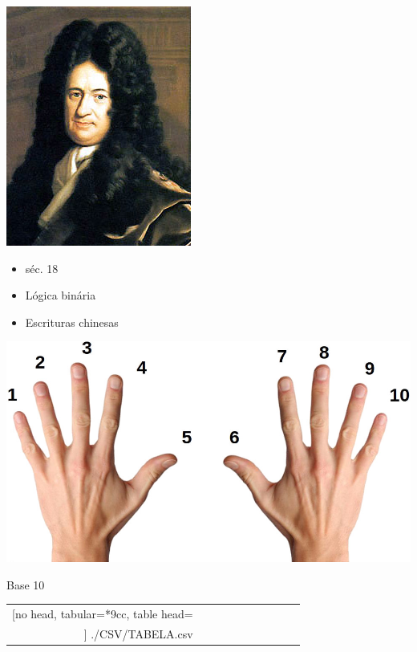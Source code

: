 \begin{multicols}{2}
	\begin{center}
	\includegraphics[height=.9\textheight]{./IMG/Gottfried+Wilhelm+Leibniz.jpg}
	\end{center}
	
	\vfill
	\columnbreak

\begin{itemize}
	\item séc. 18
	\item Lógica binária
	\item Escrituras chinesas
\end{itemize}	
\end{multicols}

\vfill
\pagebreak

\begin{center}
	\includegraphics[height=\textheight]{./IMG/MAO-10.jpg}
\end{center}

\vfill
\pagebreak

{\Huge
Base 10
}
\vspace*{-10mm}
{
	\Large
\begin{center}
		\begin{tabular}{*{10}{r}}
	\csvreader[no head, tabular=*{9}{c}c, table head=\\]%
	{./CSV/TABELA.csv}{}%
	{\csvcoli &}%
\end{tabular}
\end{center}

}

